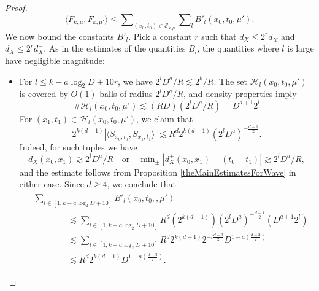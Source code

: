\begin{proof}
\begin{equation}
    \langle F_{k,\mu}, F_{k,\mu'} \rangle \leq \sum\nolimits_{(x_0,t_0) \in \mathcal{E}_{k,\mu}} \sum\nolimits_l B'_l(x_0,t_0,\mu').
\end{equation}
%
We now bound the constants $B'_l$. Pick a constant $r$ such that $d_X \leq 2^r d_X^+$ and $d_X \leq 2^r d_X^-$. As in the estimates of the quantities $B_l$, the quantities where $l$ is large have negligible magnitude:
%
\begin{itemize}
    \item For $l \leq k - a \log_2 D + 10 r$, we have $2^l D^a / R \lesssim 2^k / R$. The set $\mathcal{H}_l(x_0,t_0,\mu')$ is covered by $O(1)$ balls of radius $2^l D^a / R$, and density properties imply
    \begin{equation}
        \# \mathcal{H}_l(x_0,t_0,\mu') \lesssim (R D) (2^l D^a / R) = D^{a+1} 2^l
    \end{equation}
    For $(x_1,t_1) \in \mathcal{H}_l(x_0,t_0,\mu')$, we claim that
    \begin{equation}
        2^{k(d-1)} |\langle {S\!}_{x_0,t_0}, {S\!}_{x_1,t_1} \rangle| \lesssim R^{d} 2^{k(d-1)} (2^l D^a)^{- \frac{d-1}{2}}.
    \end{equation}
    Indeed, for such tuples we have
    \begin{equation}
        d_X(x_0,x_1) \gtrsim 2^l D^a / R \quad\text{or}\quad \min\nolimits_{\pm} |d_X^{\pm}(x_0,x_1) - (t_0 - t_1)| \gtrsim 2^l D^a / R,
    \end{equation}
    and the estimate follows from Proposition \ref{theMainEstimatesForWave} in either case. Since $d \geq 4$, we conclude that
    \begin{align} \label{BBBEquation}
    \begin{split}
        &\sum\nolimits_{l \in [1, k - a \log_2 D + 10]} B'_l(x_0,t_0,,\mu')\\
        &\quad\quad\quad\quad \lesssim \sum\nolimits_{l \in [1, k - a \log_2 D + 10]} R^{d} (2^{k(d-1)}) (2^l D^a)^{- \frac{d-1}{2}} (D^{a+1} 2^l)\\
        &\quad\quad\quad\quad \lesssim \sum\nolimits_{l \in [1, k - a \log_2 D + 10]} R^{d}  2^{k(d-1)} 2^{-l \frac{d-3}{2}} D^{1 - a \left( \frac{d-3}{2} \right)}\\
        &\quad\quad\quad\quad \lesssim R^{d} 2^{k(d-1)} D^{1 - a \left( \frac{d-3}{2} \right)}.
    \end{split}
    \end{align}


\end{itemize}
\end{proof}
